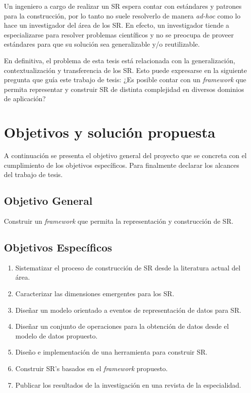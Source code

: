 Un ingeniero a cargo de realizar un SR espera contar con estándares y patrones para la construcción, por lo tanto no suele resolverlo de manera \textit{ad-hoc} como lo hace un investigador del área de los SR. En efecto, un investigador tiende a especializarse para resolver problemas científicos y no se preocupa de proveer estándares para que su solución sea generalizable y/o reutilizable.


En definitiva, el problema de esta tesis está relacionada con la generalización, contextualización y transferencia de los SR. Esto puede expresarse en la siguiente pregunta que guía este trabajo de tesis: ¿Es posible contar con un \textit{framework} que permita representar y construir SR de distinta complejidad en diversos dominios de aplicación?


\section{Objetivos y solución propuesta}

A continuación se presenta el objetivo general del proyecto que se concreta con el cumplimiento de los objetivos específicos. Para finalmente declarar los alcances del trabajo de tesis.

\subsection{Objetivo General}

Construir un \textit{framework} que permita la representación y construcción de SR.

\subsection{Objetivos Espec\'ificos}

\begin{enumerate}
	\item Sistematizar el proceso de construcción de SR desde la literatura actual del área.
	\item Caracterizar las dimensiones emergentes para los SR.
	\item Diseñar un modelo orientado a eventos de representación de datos para SR.
	\item Diseñar un conjunto de operaciones para la obtención de datos desde el modelo de datos propuesto.
	\item Diseño e implementación de una herramienta para construir SR.
	\item Construir SR’s basados en el \textit{framework} propuesto.
	\item Publicar los resultados de la investigación en una revista de la especialidad.
\end{enumerate}


